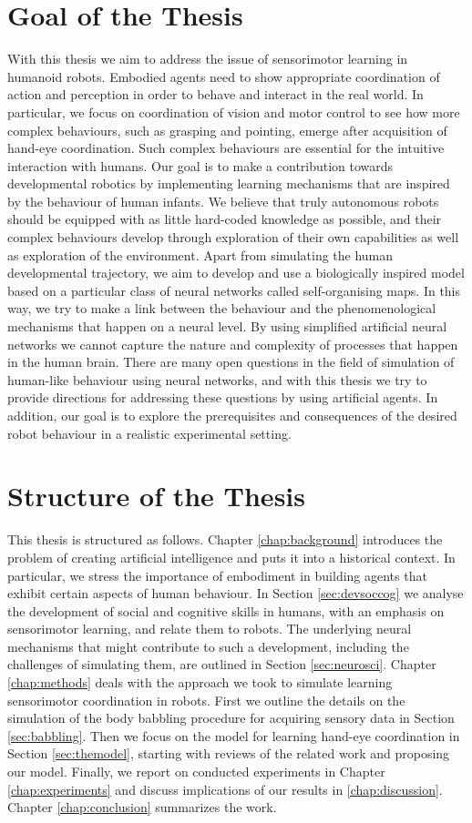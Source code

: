 \section{Goal of the Thesis}
With this thesis we aim to address the issue of sensorimotor learning in humanoid robots. Embodied agents need to show appropriate coordination of action and perception in order to behave and interact in the real world. In particular, we focus on coordination of vision and motor control to see how more complex behaviours, such as grasping and pointing, emerge after acquisition of hand-eye coordination. Such complex behaviours are essential for the intuitive interaction with humans. Our goal is to make a contribution towards developmental robotics by implementing learning mechanisms that are inspired by the behaviour of human infants. 
We believe that truly autonomous robots should be equipped with as little 
hard-coded knowledge as possible, and their complex behaviours develop through 
exploration of their own capabilities as well as exploration of the environment. 
Apart from simulating the human developmental trajectory, we aim to develop and 
use a biologically inspired model based on a particular class of neural networks 
called self-organising maps. In this way, we try to make a link between the 
behaviour and the phenomenological mechanisms that happen on a neural level. By 
using simplified artificial neural networks we cannot capture the nature and 
complexity of processes that happen in the human brain. There are many open 
questions in the field of simulation of human-like behaviour using neural 
networks, and with this thesis we try to provide directions for addressing these 
questions by using artificial agents. In addition, our goal is to explore the 
prerequisites and consequences of the desired robot behaviour in a realistic 
experimental setting.

\section{Structure of the Thesis}
This thesis is structured as follows. Chapter \ref{chap:background} introduces the problem of creating artificial intelligence and puts it into a historical context. In particular, we stress the importance of embodiment in building agents that exhibit certain aspects of human behaviour. In Section \ref{sec:devsoccog} we analyse the development of social and cognitive skills in humans, with an emphasis on sensorimotor learning, and relate them to robots. The underlying neural mechanisms that might contribute to such a development, including the challenges of simulating them, are outlined in Section \ref{sec:neurosci}. Chapter \ref{chap:methods} deals with the approach we took to simulate learning sensorimotor coordination in robots. First we outline the details on the simulation of the body babbling procedure for acquiring sensory data in Section \ref{sec:babbling}. Then we focus on the model for learning hand-eye coordination in Section \ref{sec:themodel}, starting with reviews of the related work and 
proposing our model. Finally, we report on conducted experiments in Chapter \ref{chap:experiments} and discuss implications of our results in \ref{chap:discussion}. Chapter \ref{chap:conclusion} summarizes the work.

